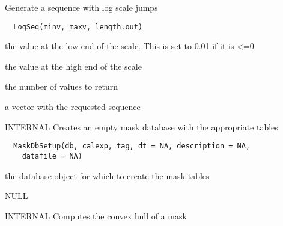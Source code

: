 \documentclass[a4paper]{book}
\begin{document}
%
\begin{Description}\relax
Generate a sequence with log scale jumps
\end{Description}
%
\begin{Usage}
\begin{verbatim}
  LogSeq(minv, maxv, length.out)
\end{verbatim}
\end{Usage}
%
\begin{Arguments}
\begin{ldescription}
\item[\code{minv}] the value at the low end of the scale.  This
is set to 0.01 if it is <=0

\item[\code{maxv}] the value at the high end of the scale

\item[\code{length.out}] the number of values to return
\end{ldescription}
\end{Arguments}
%
\begin{Value}
a vector with the requested sequence
\end{Value}
%
\begin{Description}\relax
INTERNAL Creates an empty mask database with the
appropriate tables
\end{Description}
%
\begin{Usage}
\begin{verbatim}
  MaskDbSetup(db, calexp, tag, dt = NA, description = NA,
    datafile = NA)
\end{verbatim}
\end{Usage}
%
\begin{Arguments}
\begin{ldescription}
\item[\code{db}] the database object for which to create the
mask tables
\end{ldescription}
\end{Arguments}
%
\begin{Value}
NULL
\end{Value}
%
\begin{Description}\relax
INTERNAL Computes the convex hull of a mask
\end{Description}
\end{document}
